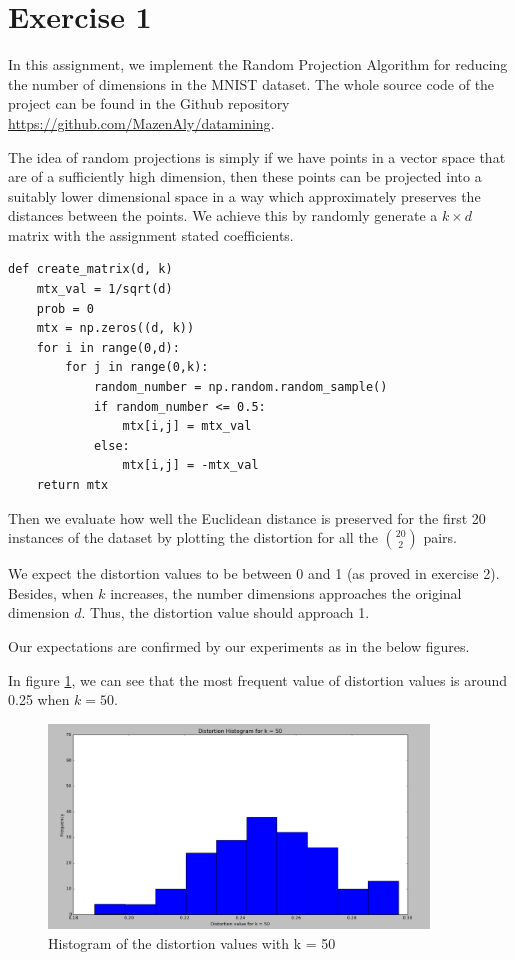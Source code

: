 \section*{Exercise 1}
In this assignment, we implement the Random Projection Algorithm for reducing the number of dimensions in the MNIST dataset. The whole source code of the project can be found in the Github repository \url{https://github.com/MazenAly/datamining}.

The idea of random projections is simply if we have points in a vector space that are of a sufficiently high dimension, then these points can be projected into a suitably lower dimensional space in a way which approximately preserves the distances between the points.
We achieve this by randomly generate a $k \times d$ matrix with the assignment stated coefficients.

\begin{lstlisting}[frame=single]
def create_matrix(d, k)    
    mtx_val = 1/sqrt(d)
    prob = 0
    mtx = np.zeros((d, k))
    for i in range(0,d):
        for j in range(0,k):
            random_number = np.random.random_sample()
            if random_number <= 0.5:
                mtx[i,j] = mtx_val
            else:
                mtx[i,j] = -mtx_val        
    return mtx
\end{lstlisting}
    
Then we evaluate how well the Euclidean distance is preserved for the first 20 instances of the dataset by plotting the distortion for all the ${20\choose 2}$ pairs.

We expect the distortion values to be between 0 and 1 (as proved in exercise 2). Besides, when $k$ increases, the number dimensions approaches the original dimension $d$. Thus, the distortion value should approach 1.
   
Our expectations are confirmed by our experiments as in the below figures. 

In figure \ref{k50}, we can see that the most frequent value of distortion values is around 0.25 when $k = 50$.

\begin{figure}[!htb]
\centering
\includegraphics[width=0.9\textwidth]{shots/k50.png}
\caption{Histogram of the distortion values with k = 50 }
\label{k50}
\end{figure}

